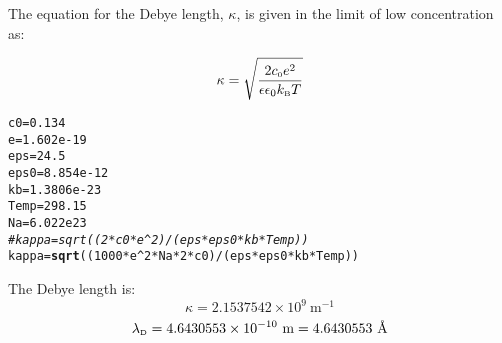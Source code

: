 \documentclass{article}\usepackage[]{graphicx}\usepackage[]{color}
\makeatletter
\newcommand{\hlnum}[1]{\textcolor[rgb]{0.686,0.059,0.569}{#1}}%
\newcommand{\hlcom}[1]{\textcolor[rgb]{0.678,0.584,0.686}{\textit{#1}}}%
\newcommand{\hlopt}[1]{\textcolor[rgb]{0,0,0}{#1}}%
\newcommand{\hlstd}[1]{\textcolor[rgb]{0.345,0.345,0.345}{#1}}%
\newcommand{\hlkwb}[1]{\textcolor[rgb]{0.69,0.353,0.396}{#1}}%
\newcommand{\hlkwd}[1]{\textcolor[rgb]{0.737,0.353,0.396}{\textbf{#1}}}%
\newenvironment{kframe}{%
 \def\at@end@of@kframe{}%
 \ifinner\ifhmode%
  \def\at@end@of@kframe{\end{minipage}}%
  \begin{minipage}{\columnwidth}%
 \fi\fi%
 \def\FrameCommand##1{\hskip\@totalleftmargin \hskip-\fboxsep
 \colorbox{shadecolor}{##1}\hskip-\fboxsep
     \hskip-\linewidth \hskip-\@totalleftmargin \hskip\columnwidth}%
 \MakeFramed {\advance\hsize-\width
   \@totalleftmargin\z@ \linewidth\hsize
   \@setminipage}}%
 {\par\unskip\endMakeFramed%
 \at@end@of@kframe}
\newenvironment{knitrout}{}{} %
\newcommand{\ttext}[1]{\text{\tiny #1}}
\makeatother
\begin{document}
The equation for the Debye length, $\kappa$, is given in the limit of low concentration as:

$$\kappa = \sqrt{\frac{2c_\ttext{0} e^2}{\epsilon \epsilon_0 k_\ttext{B} T}}$$

\begin{knitrout}
\color{fgcolor}\begin{kframe}
\begin{alltt}
  \hlstd{c0} \hlkwb{=} \hlnum{0.134}
  \hlstd{e} \hlkwb{=} \hlnum{1.602e-19}
  \hlstd{eps} \hlkwb{=} \hlnum{24.5}
  \hlstd{eps0} \hlkwb{=} \hlnum{8.854e-12}
  \hlstd{kb} \hlkwb{=} \hlnum{1.3806e-23}
  \hlstd{Temp}\hlkwb{=}\hlnum{298.15}
  \hlstd{Na} \hlkwb{=} \hlnum{6.022e23}
  \hlcom{#kappa = sqrt((2*c0*e^2)/(eps*eps0*kb*Temp))}
  \hlstd{kappa} \hlkwb{=} \hlkwd{sqrt}\hlstd{((}\hlnum{1000}\hlopt{*}\hlstd{e}\hlopt{^}\hlnum{2}\hlopt{*}\hlstd{Na}\hlopt{*}\hlnum{2}\hlopt{*}\hlstd{c0)}\hlopt{/}\hlstd{(eps}\hlopt{*}\hlstd{eps0}\hlopt{*}\hlstd{kb}\hlopt{*}\hlstd{Temp))}
\end{alltt}
\end{kframe}
\end{knitrout}
The Debye length is:
$$\kappa = \ensuremath{2.1537542\times 10^{9}}\ \text{m}^{-1}$$
$$\lambda_\ttext{D} = \ensuremath{4.6430553\times 10^{-10}}\ \text{m} = 4.6430553\ \text{\AA}$$
\end{document}
